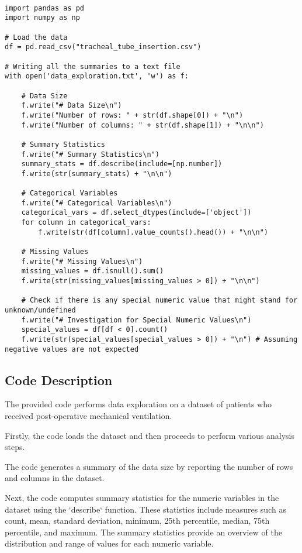 \documentclass[11pt]{article}
\begin{document}
\begin{verbatim}

import pandas as pd
import numpy as np

# Load the data
df = pd.read_csv("tracheal_tube_insertion.csv")

# Writing all the summaries to a text file
with open('data_exploration.txt', 'w') as f:

    # Data Size
    f.write("# Data Size\n")
    f.write("Number of rows: " + str(df.shape[0]) + "\n")
    f.write("Number of columns: " + str(df.shape[1]) + "\n\n")

    # Summary Statistics
    f.write("# Summary Statistics\n")
    summary_stats = df.describe(include=[np.number])
    f.write(str(summary_stats) + "\n\n")

    # Categorical Variables
    f.write("# Categorical Variables\n")
    categorical_vars = df.select_dtypes(include=['object'])
    for column in categorical_vars:
        f.write(str(df[column].value_counts().head()) + "\n\n")

    # Missing Values
    f.write("# Missing Values\n")
    missing_values = df.isnull().sum()
    f.write(str(missing_values[missing_values > 0]) + "\n\n")

    # Check if there is any special numeric value that might stand for unknown/undefined
    f.write("# Investigation for Special Numeric Values\n")
    special_values = df[df < 0].count()
    f.write(str(special_values[special_values > 0]) + "\n") # Assuming negative values are not expected

\end{verbatim}

\subsection{Code Description}

The provided code performs data exploration on a dataset of patients who received post-operative mechanical ventilation. 

Firstly, the code loads the dataset and then proceeds to perform various analysis steps.

The code generates a summary of the data size by reporting the number of rows and columns in the dataset.

Next, the code computes summary statistics for the numeric variables in the dataset using the `describe` function. These statistics include measures such as count, mean, standard deviation, minimum, 25th percentile, median, 75th percentile, and maximum. The summary statistics provide an overview of the distribution and range of values for each numeric variable.
\end{document}
